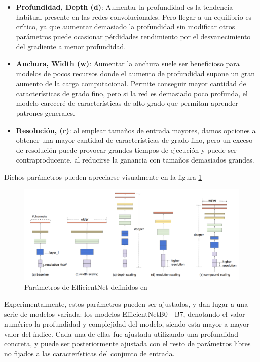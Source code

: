 \begin{itemize}
	 \item  \textbf{Profundidad, Depth (d)}:  Aumentar la profundidad es la tendencia habitual presente en las redes convolucionales. Pero llegar a un equilibrio es crítico, ya que aumentar demasiado la profundidad sin modificar otros parámetros puede ocasionar pérdidades rendimiento por el desvanecimiento del gradiente  a menor profundidad. 
	\item  \textbf{Anchura, Width (w)}: Aumentar la anchura suele ser beneficioso para modelos de pocos recursos donde el aumento de profundidad supone un gran aumento de la carga computacional. Permite conseguir mayor cantidad de características de grado fino, pero si la red es demasiado poco profunda, el modelo careceré de características de alto grado que permitan aprender patrones generales.
	\item  \textbf{Resolución, (r)}: al emplear tamaños de entrada mayores, damos opciones a obtener una mayor cantidad de características de grado fino, pero un exceso de resolución puede provocar grandes tiempos de ejecución y puede ser contraproducente, al reducirse la ganancia con tamaños demasiados grandes.
\end{itemize}

Dichos parámetros pueden apreciarse visualmente en la figura \ref{fig:paramsefnet}

\begin{figure}[H]
	\centering
	\includegraphics[scale = 0.2]{imagenes/efnet_scale.png}
	\caption{Parámetros de EfficientNet definidos en~\cite{Chaturvedi_2020}}
	\label{fig:paramsefnet}
\end{figure}


Experimentalmente, estos parámetros pueden ser ajustados, y dan lugar a una serie de modelos variada: los modelos EfficientNetB0 - B7, denotando el valor numérico la profundidad y complejidad del modelo, siendo esta mayor a mayor valor del índice. Cada una de ellas fue ajustada utilizando una profundidad concreta, y puede ser posteriormente ajustada con el resto de parámetros libres no fijados a las características del conjunto de entrada.

